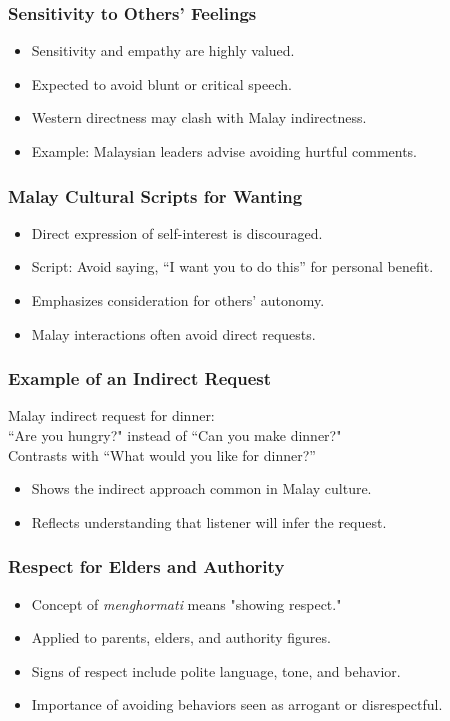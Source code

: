 \documentclass[xetex]{beamer}
\begin{document}
\begin{frame}
\frametitle{Sensitivity to Others' Feelings}
\begin{itemize}
    \item Sensitivity and empathy are highly valued.
    \item Expected to avoid blunt or critical speech.
    \item Western directness may clash with Malay indirectness.
    \item Example: Malaysian leaders advise avoiding hurtful comments.
\end{itemize}
\end{frame}

\begin{frame}
\frametitle{Malay Cultural Scripts for Wanting}
\begin{itemize}
    \item Direct expression of self-interest is discouraged.
    \item Script: Avoid saying, “I want you to do this” for personal benefit.
    \item Emphasizes consideration for others’ autonomy.
    \item Malay interactions often avoid direct requests.
\end{itemize}
\end{frame}

\begin{frame}
\frametitle{Example of an Indirect Request}
\begin{exe}
    \ex Malay indirect request for dinner: \\
    ``Are you hungry?" instead of ``Can you make dinner?"
    \\ Contrasts with ``What would you like for dinner?''
\end{exe}
\begin{itemize}
    \item Shows the indirect approach common in Malay culture.
    \item Reflects understanding that listener will infer the request.
\end{itemize}
\end{frame}

\begin{frame}
\frametitle{Respect for Elders and Authority}
\begin{itemize}
    \item Concept of \textit{menghormati} means "showing respect."
    \item Applied to parents, elders, and authority figures.
    \item Signs of respect include polite language, tone, and behavior.
    \item Importance of avoiding behaviors seen as arrogant or disrespectful.
\end{itemize}
\end{frame}
\end{document}
